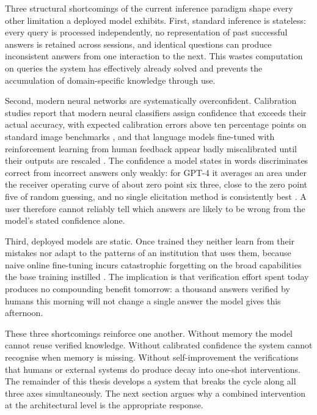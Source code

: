 Three structural shortcomings of the current inference paradigm shape every other limitation a deployed model exhibits. First, standard inference is stateless: every query is processed independently, no representation of past successful answers is retained across sessions, and identical questions can produce inconsistent answers from one interaction to the next. This wastes computation on queries the system has effectively already solved and prevents the accumulation of domain-specific knowledge through use.

Second, modern neural networks are systematically overconfident. Calibration studies report that modern neural classifiers assign confidence that exceeds their actual accuracy, with expected calibration errors above ten percentage points on standard image benchmarks \cite{pmlr-v70-guo17a}, and that language models fine-tuned with reinforcement learning from human feedback appear badly miscalibrated until their outputs are rescaled \cite{kadavath2022language}. The confidence a model states in words discriminates correct from incorrect answers only weakly: for GPT-4 it averages an area under the receiver operating curve of about zero point six three, close to the zero point five of random guessing, and no single elicitation method is consistently best \cite{xiong2023can}. A user therefore cannot reliably tell which answers are likely to be wrong from the model's stated confidence alone.

Third, deployed models are static. Once trained they neither learn from their mistakes nor adapt to the patterns of an institution that uses them, because naive online fine-tuning incurs catastrophic forgetting on the broad capabilities the base training instilled \cite{doi:10.1073/pnas.1611835114}. The implication is that verification effort spent today produces no compounding benefit tomorrow: a thousand answers verified by humans this morning will not change a single answer the model gives this afternoon.

These three shortcomings reinforce one another. Without memory the model cannot reuse verified knowledge. Without calibrated confidence the system cannot recognise when memory is missing. Without self-improvement the verifications that humans or external systems do produce decay into one-shot interventions. The remainder of this thesis develops a system that breaks the cycle along all three axes simultaneously. The next section argues why a combined intervention at the architectural level is the appropriate response.

